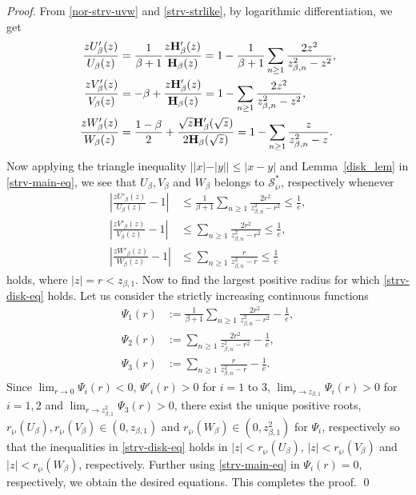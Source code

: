 \documentclass[12pt, reqno]{amsart}
\numberwithin{equation}{section}
\theoremstyle{plain}
\theoremstyle{definition}
\theoremstyle{remark}
\begin{document}
\begin{proof}
	From \eqref{nor-strv-uvw} and \eqref{strv-strlike}, by logarithmic differentiation, we get 
	\begin{align}\label{strv-main-eq}
	\frac{zU'_{\beta}(z)}{U_{\beta}(z)}&=\frac{1}{\beta+1}\frac{z{\bf{H}}'_{\beta}(z)}{{\bf{H}}_{\beta}(z)}=1-\frac{1}{\beta+1}\sum_{n\geq1}\frac{2z^2}{z^2_{\beta,n}-z^2},\nonumber\\
	\frac{zV'_{\beta}(z)}{V_{\beta}(z)}&=-\beta+\frac{z{\bf{H}}'_{\beta}(z)}{{\bf{H}}_{\beta}(z)}=1-\sum_{n\geq1}\frac{2z^2}{z^2_{\beta,n}-z^2},\nonumber\\
	\frac{zW'_{\beta}(z)}{W_{\beta}(z)}&= \frac{1-\beta}{2}+\frac{\sqrt{z}{\bf{H}}'_{\beta}(\sqrt{z})}{{2\bf{H}}_{\beta}(\sqrt{z})}=1-\sum_{n\geq1}\frac{z}{z^2_{\beta,n}-z}.
	\end{align}	
	Now applying the triangle inequality $||x|-|y||\leq |x-y|$ and Lemma~\ref{disk_lem} in \eqref{strv-main-eq}, we see that  $U_{\beta}, V_{\beta}$ and $W_{\beta}$ belongs to $\mathcal{S}^*_{\wp}$, respectively whenever
	\begin{align}\label{strv-disk-eq}
	\left|\frac{zU'_{\beta}(z)}{U_{\beta}(z)}-1\right| &\leq \frac{1}{\beta+1}\sum_{n\geq1}\frac{2r^2}{z^2_{\beta,n}-r^2}\leq\frac{1}{e},\nonumber\\
	\left|\frac{zV'_{\beta}(z)}{V_{\beta}(z)}-1\right| &\leq \sum_{n\geq1}\frac{2r^2}{z^2_{\beta,n}-r^2}\leq\frac{1}{e},\nonumber\\
	\left|\frac{zW'_{\beta}(z)}{W_{\beta}(z)}-1\right| &\leq \sum_{n\geq1}\frac{r}{z^2_{\beta,n}-r}\leq\frac{1}{e}
	\end{align} 
	holds, where $|z|=r<z_{\beta,1}$. Now to find the largest positive radius for which \eqref{strv-disk-eq} holds. Let us consider the strictly increasing continuous functions
	\begin{align*}
	\Psi_1(r)&:=\frac{1}{\beta+1}\sum_{n\geq1}\frac{2r^2}{z^2_{\beta,n}-r^2}-\frac{1}{e},\\
	\Psi_2(r)&:= \sum_{n\geq1}\frac{2r^2}{z^2_{\beta,n}-r^2}-\frac{1}{e},\\
	\Psi_3(r)&:= \sum_{n\geq1}\frac{r}{z^2_{\beta,n}-r}-\frac{1}{e} .
	\end{align*}
	Since $\lim_{r\rightarrow0}\Psi_{i}(r)<0$, $\Psi'_{i}(r)>0$ for $i=1$ to $3$, $\lim_{r\rightarrow z_{\beta,1}}\Psi_{i}(r)>0$ for $i=1,2$ and  $\lim_{r\rightarrow {z^2_{\beta,1}}}\Psi_{3}(r)>0$, there exist the unique positive roots, $r_{\wp}(U_{\beta}), r_{\wp}(V_{\beta}) \in (0,z_{\beta,1})$ and $r_{\wp}(W_{\beta})\in(0,{z^2_{\beta,1}})$ for $\Psi_{i}$, respectively so that the inequalities in \eqref{strv-disk-eq} holds in $|z|<r_{\wp}(U_{\beta})$, $|z|<r_{\wp}(V_{\beta})$ and $|z|<r_{\wp}(W_{\beta})$, respectively. Further using \eqref{strv-main-eq} in $\Psi_i(r)=0$, respectively, we obtain the desired equations. This completes the proof. \qed
	
\end{proof}	
\end{document}
